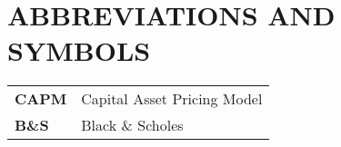\section*{ABBREVIATIONS AND SYMBOLS}

\begin{tabular}{l l}
\textbf{CAPM} & Capital Asset Pricing Model\\
\textbf{B\&S} & Black \& Scholes\\

\end{tabular}

